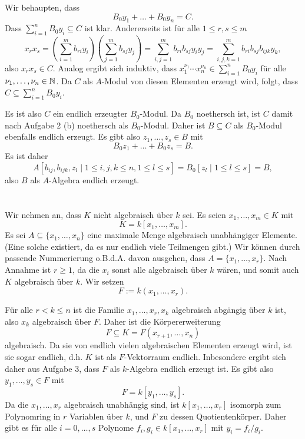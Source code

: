\documentclass[a4paper,10pt]{article}
\begin{document}
Wir behaupten, dass
\[
 B_0 y_1 + \ldots + B_0 y_n = C.
\]
Dass $\sum_{i=1}^n B_0 y_i \subseteq C$ ist klar. Andererseits ist für alle $1 \leq r,s \leq m$
\[
 x_r x_s
 = \left( \sum_{i=1}^m b_{ri} y_i \right) \left( \sum_{j=1}^m b_{sj} y_j \right)
 = \sum_{i,j=1}^m b_{ri} b_{sj} y_i y_j
 = \sum_{i,j,k=1}^m b_{ri} b_{sj} b_{ijk} y_k,
\]
also $x_r x_s \in C$. Analog ergibt sich induktiv, dass $x_1^{\nu_1} \cdots x_n^{\nu_n} \in \sum_{i=1}^n B_0 y_i$ für alle $\nu_1, \ldots, \nu_n \in \mathbb{N}$. Da $C$ als $A$-Modul von diesen Elementen erzeugt wird, folgt, dass $C \subseteq \sum_{i=1}^n B_0 y_i$.

Es ist also $C$ ein endlich erzeugter $B_0$-Modul. Da $B_0$ noethersch ist, ist $C$ damit nach Aufgabe 2 (b) noethersch als $B_0$-Modul. Daher ist $B \subseteq C$ als $B_0$-Modul ebenfalls endlich erzeugt. Es gibt also $z_1, \ldots, z_s \in B$ mit
\[
 B_0 z_1 + \ldots + B_0 z_s = B.
\]
Es ist daher
\[
 A[b_{ij}, b_{ijk}, z_l \mid 1 \leq i,j,k \leq n, 1 \leq l \leq s ]
 = B_0 [z_l \mid 1 \leq l \leq s]
 = B,
\]
also $B$ als $A$-Algebra endlich erzeugt.





\section{}
Wir nehmen an, dass $K$ nicht algebraisch über $k$ sei.
Es seien $x_1, \ldots, x_m \in K$ mit
\[
 K = k[x_1, \ldots, x_m].
\]
Es sei $A \subseteq \{x_1, \ldots, x_n\}$ eine maximale Menge algebraisch unabhängiger Elemente. (Eine solche existiert, da es nur endlich viele Teilmengen gibt.) Wir können durch passende Nummerierung o.B.d.A. davon ausgehen, dass $A = \{x_1, \ldots, x_r\}$. Nach Annahme ist $r \geq 1$, da die $x_i$ sonst alle algebraisch über $k$ wären, und somit auch $K$ algebraisch über $k$. Wir setzen
\[
 F := k(x_1, \ldots, x_r).
\]

Für alle $r < k \leq n$ ist die Familie $x_1, \ldots, x_r, x_k$ algebraisch abgängig über $k$ ist, also $x_k$ algebraisch über $F$. Daher ist die Körpererweiterung
\[
 F \subseteq K = F(x_{r+1}, \ldots, x_n)
\]
algebraisch. Da sie von endlich vielen algebraischen Elementen erzeugt wird, ist sie sogar endlich, d.h. $K$ ist als $F$-Vektorraum endlich. Inbesondere ergibt sich daher aus Aufgabe 3, dass $F$ als $k$-Algebra endlich erzeugt ist. Es gibt also $y_1, \ldots, y_s \in F$ mit
\[
 F = k[y_1, \ldots, y_s].
\]
Da die $x_1, \ldots, x_r$ algebraisch unabhängig sind, ist $k[x_1, \ldots, x_r]$ isomorph zum Polynomring in $r$ Variablen über $k$, und $F$ zu dessen Quotientenkörper. Daher gibt es für alle $i = 0, \ldots, s$ Polynome $f_i, g_i \in k[x_1, \ldots, x_r]$ mit $y_i = f_i/g_i$.
\end{document}
